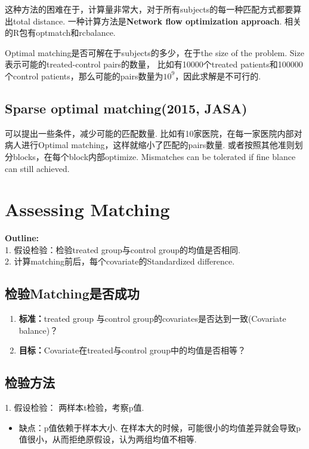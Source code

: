 这种方法的困难在于，计算量非常大，对于所有subjects的每一种匹配方式都要算出total distance. 一种计算方法是{\bfseries Network flow optimization approach}. 相关的R包有optmatch和rcbalance. 

Optimal matching是否可解在于subjects的多少，在于the size of the problem. Size表示可能的treated-control pairs的数量， 比如有10000个treated patients和100000个control patients，那么可能的pairs数量为$10^{9}$，因此求解是不可行的.
 
\subsection{Sparse optimal matching(2015, JASA)}
可以提出一些条件，减少可能的匹配数量. 比如有10家医院，在每一家医院内部对病人进行Optimal matching，这样就缩小了匹配的pairs数量. 或者按照其他准则划分blocks，在每个block内部optimize.
Mismatches can be tolerated if fine blance can still achieved.

\section{Assessing Matching}
\label{assessmatch}
{\bfseries Outline:}\\
1. 假设检验：检验treated group与control group的均值是否相同.\\
2. 计算matching前后，每个covariate的Standardized difference. 

\subsection{检验Matching是否成功}
\begin{enumerate}[itemindent=2em,label=(\arabic*)] 
	\item {\bfseries 标准：}treated group 与control group的covariates是否达到一致(Covariate balance)？
	\item {\bfseries 目标：}Covariate在treated与control group中的均值是否相等？
\end{enumerate}

\subsection{检验方法}
1. 假设检验： 两样本t检验，考察p值.
\begin{itemize}
	\item 缺点：p值依赖于样本大小. 在样本大的时候，可能很小的均值差异就会导致p值很小，从而拒绝原假设，认为两组均值不相等.
\end{itemize}

